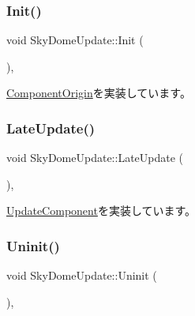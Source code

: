 \subsubsection{\texorpdfstring{Init()}{Init()}}
{\footnotesize\ttfamily void Sky\+Dome\+Update\+::\+Init (\begin{DoxyParamCaption}{ }\end{DoxyParamCaption})\hspace{0.3cm}{\ttfamily [override]}, {\ttfamily [virtual]}}



\mbox{\hyperlink{class_component_origin_a9f674891257f2272b1636d8b6bb05d81}{Component\+Origin}}を実装しています。

\mbox{\label{class_sky_dome_update_a94347cb50b4dc13528738a7b812da261}} 
\subsubsection{\texorpdfstring{Late\+Update()}{LateUpdate()}}
{\footnotesize\ttfamily void Sky\+Dome\+Update\+::\+Late\+Update (\begin{DoxyParamCaption}{ }\end{DoxyParamCaption})\hspace{0.3cm}{\ttfamily [override]}, {\ttfamily [virtual]}}



\mbox{\hyperlink{class_update_component_aecc61593be4d1feff2db4d9ff1f83f9f}{Update\+Component}}を実装しています。

\mbox{\label{class_sky_dome_update_a54da74ef017a22075ce473abe1345489}} 
\subsubsection{\texorpdfstring{Uninit()}{Uninit()}}
{\footnotesize\ttfamily void Sky\+Dome\+Update\+::\+Uninit (\begin{DoxyParamCaption}{ }\end{DoxyParamCaption})\hspace{0.3cm}{\ttfamily [override]}, {\ttfamily [virtual]}}



